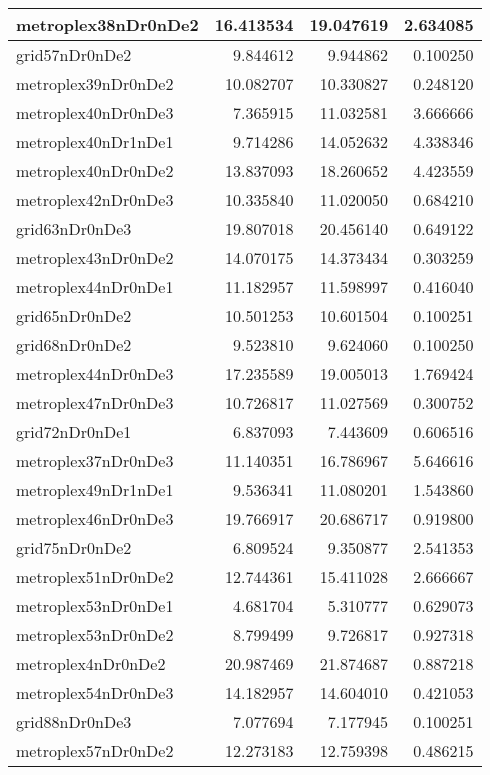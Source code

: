 \documentclass[../../../thesis.tex]{subfiles}
\begin{document}
\begin{longtable}{|l|r|r|r|}
metroplex38nDr0nDe2 & 16.413534 & 19.047619 & 2.634085 \\\hline
grid57nDr0nDe2 & 9.844612 & 9.944862 & 0.100250 \\\hline
metroplex39nDr0nDe2 & 10.082707 & 10.330827 & 0.248120 \\\hline
metroplex40nDr0nDe3 & 7.365915 & 11.032581 & 3.666666 \\\hline
metroplex40nDr1nDe1 & 9.714286 & 14.052632 & 4.338346 \\\hline
metroplex40nDr0nDe2 & 13.837093 & 18.260652 & 4.423559 \\\hline
metroplex42nDr0nDe3 & 10.335840 & 11.020050 & 0.684210 \\\hline
grid63nDr0nDe3 & 19.807018 & 20.456140 & 0.649122 \\\hline
metroplex43nDr0nDe2 & 14.070175 & 14.373434 & 0.303259 \\\hline
metroplex44nDr0nDe1 & 11.182957 & 11.598997 & 0.416040 \\\hline
grid65nDr0nDe2 & 10.501253 & 10.601504 & 0.100251 \\\hline
grid68nDr0nDe2 & 9.523810 & 9.624060 & 0.100250 \\\hline
metroplex44nDr0nDe3 & 17.235589 & 19.005013 & 1.769424 \\\hline
metroplex47nDr0nDe3 & 10.726817 & 11.027569 & 0.300752 \\\hline
grid72nDr0nDe1 & 6.837093 & 7.443609 & 0.606516 \\\hline
metroplex37nDr0nDe3 & 11.140351 & 16.786967 & 5.646616 \\\hline
metroplex49nDr1nDe1 & 9.536341 & 11.080201 & 1.543860 \\\hline
metroplex46nDr0nDe3 & 19.766917 & 20.686717 & 0.919800 \\\hline
grid75nDr0nDe2 & 6.809524 & 9.350877 & 2.541353 \\\hline
metroplex51nDr0nDe2 & 12.744361 & 15.411028 & 2.666667 \\\hline
metroplex53nDr0nDe1 & 4.681704 & 5.310777 & 0.629073 \\\hline
metroplex53nDr0nDe2 & 8.799499 & 9.726817 & 0.927318 \\\hline
metroplex4nDr0nDe2 & 20.987469 & 21.874687 & 0.887218 \\\hline
metroplex54nDr0nDe3 & 14.182957 & 14.604010 & 0.421053 \\\hline
grid88nDr0nDe3 & 7.077694 & 7.177945 & 0.100251 \\\hline
metroplex57nDr0nDe2 & 12.273183 & 12.759398 & 0.486215 \\\hline

\end{longtable}
\end{document}
